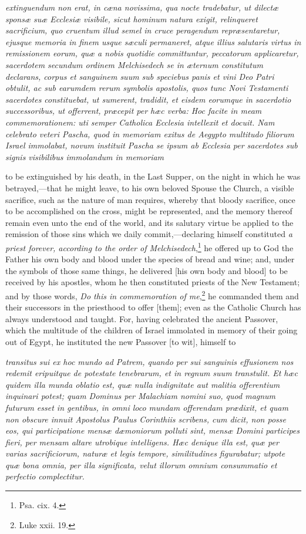 \emph{extinguendum non erat, in cæna novissima, qua nocte tradebatur, ut dilectæ sponsæ suæ Ecclesiæ visibile, sicut hominum natura exigit, relinqueret sacrificium, quo cruentum illud semel in cruce peragendum repræsentaretur, ejusque memoria in finem usque sæculi permaneret, atque illius salutaris virtus in remissionem eorum, quæ a nobis quotidie committuntur, peccatorum applicaretur, sacerdotem secundum ordinem Melchisedech se in æternum constitutum declarans, corpus et sanguinem suum sub speciebus panis et vini Deo Patri obtulit, ac sub earumdem rerum symbolis apostolis, quos tunc Novi Testamenti sacerdotes constituebat, ut sumerent, tradidit, et eisdem eorumque in sacerdotio successoribus, ut offerrent, præcepit per hæc verba: Hoc facite in meam commemorationem: uti semper Catholica Ecclesia intellexit et docuit. Nam celebrato veteri Pascha, quod in memoriam exitus de Aegypto multitudo filiorum Israel immolabat, novum instituit Pascha se ipsum ab Ecclesia per sacerdotes sub signis visibilibus immolandum in memoriam }

to be extinguished by his death, in the Last Supper, on the night in which he was betrayed,—that he might leave, to his own beloved Spouse the Church, a visible sacrifice, such as the nature of man requires, whereby that bloody sacrifice, once to be accomplished on the cross, might be represented, and the memory thereof remain even unto the end of the world, and its salutary virtue be applied to the remission of those sins which we daily commit,—declaring himself constituted \emph{a priest forever, according to the order of Melchisedech},\footnote{\par   Psa. cix. 4.} he offered up to God the Father his own body and blood under the species of bread and wine; and, under the symbols of those same things, he delivered [his own body and blood] to be received by his apostles, whom he then constituted priests of the New Testament; and by those words, \emph{Do this in commemoration of me},\footnote{\par   Luke xxii. 19.} he commanded them and their successors in the priesthood to offer [them]; even as the Catholic Church has always understood and taught. For, having celebrated the ancient Passover, which the multitude of the children of Israel immolated in memory of their going out of Egypt, he instituted the new Passover [to wit], himself to

\emph{transitus sui ex hoc mundo ad Patrem, quando per sui sanguinis effusionem nos redemit eripuitque de potestate tenebrarum, et in regnum suum transtulit. Et hæc quidem illa munda oblatio est, quæ nulla indignitate aut malitia offerentium inquinari potest; quam Dominus per Malachiam nomini suo, quod magnum futurum esset in gentibus, in omni loco mundam offerendam prædixit, et quam non obscure innuit Apostolus Paulus Corinthiis scribens, cum dicit, non posse eos, qui participatione mensæ dæmoniorum polluti sint, mensæ Domini participes fieri, per mensam altare utrobique intelligens. Hæc denique illa est, quæ per varias sacrificiorum, naturæ et legis tempore, similitudines figurabatur; utpote quæ bona omnia, per illa significata, velut illorum omnium consummatio et perfectio complectitur.}

